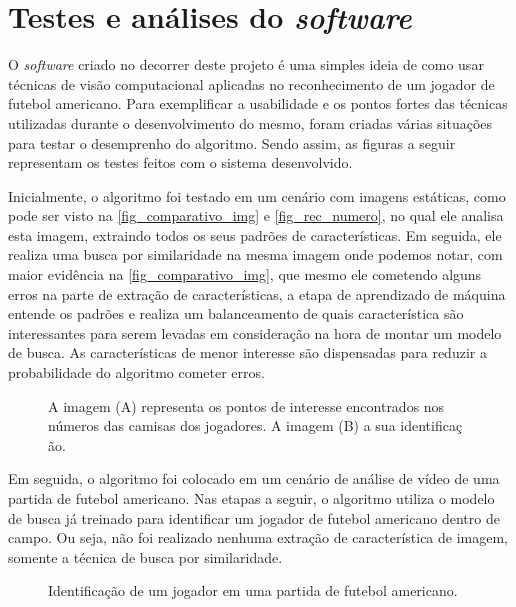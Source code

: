 \section{\textbf{Testes e análises do \textit{software}}}
\label{testes_do_software}
O \textit{software} criado no decorrer deste projeto é uma simples ideia de como usar técnicas de visão computacional aplicadas no reconhecimento de um jogador de futebol americano. Para exemplificar a usabilidade e os pontos fortes das técnicas utilizadas durante o desenvolvimento do mesmo, foram criadas várias situações para testar o desemprenho do algoritmo. Sendo assim, as figuras a seguir representam os testes feitos com o sistema desenvolvido.

Inicialmente, o algoritmo foi testado em um cenário com imagens estáticas, como pode ser visto na \autoref{fig_comparativo_img} e \autoref{fig_rec_numero}, no qual ele analisa esta imagem, extraindo todos os seus padrões de características. Em seguida, ele realiza uma busca por similaridade na mesma imagem onde podemos notar, com maior evidência na  \autoref{fig_comparativo_img}, que mesmo ele cometendo alguns erros na parte de extração de características, a etapa de aprendizado de máquina entende os padrões e realiza  um balanceamento de quais característica são interessantes para serem levadas em consideração na hora de montar um modelo de busca. As características de menor interesse são dispensadas para reduzir a probabilidade do algoritmo cometer erros.

\begin{figure}[ht]
	\caption{\label{fig_rec_numero}A imagem (A) representa os pontos de interesse encontrados nos números das camisas dos jogadores. A imagem (B) a sua identificaç ão.}
	\begin{center}
	\end{center}
	\centering {}
\end{figure}

Em seguida, o algoritmo foi colocado em um cenário de análise de vídeo de uma partida de futebol americano. Nas etapas a seguir, o algoritmo utiliza o modelo de busca já treinado para identificar um jogador de futebol americano dentro de campo. Ou seja, não foi realizado nenhuma extração de característica de imagem, somente a técnica de busca por similaridade.


\begin{figure}[ht]
	\caption{\label{fig_rep_jogador_em_campo}Identificação de um jogador em uma partida de futebol americano.}
	\begin{center}
	\end{center}
	\centering {}
\end{figure}

